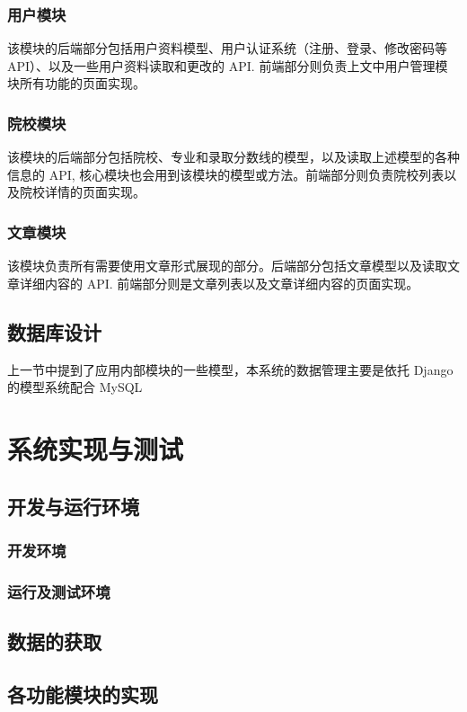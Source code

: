 \documentclass[a4paper,AutoFakeBold,oneside,12pt]{book}
\begin{document}
\subsection{用户模块}
该模块的后端部分包括用户资料模型、用户认证系统（注册、登录、修改密码等 API）、以及一些用户资料读取和更改的 API. 前端部分则负责上文中用户管理模块所有功能的页面实现。

\subsection{院校模块}
该模块的后端部分包括院校、专业和录取分数线的模型，以及读取上述模型的各种信息的 API, 核心模块也会用到该模块的模型或方法。前端部分则负责院校列表以及院校详情的页面实现。

\subsection{文章模块}
该模块负责所有需要使用文章形式展现的部分。后端部分包括文章模型以及读取文章详细内容的 API. 前端部分则是文章列表以及文章详细内容的页面实现。

\section{数据库设计}
上一节中提到了应用内部模块的一些模型，本系统的数据管理主要是依托 Django 的模型系统配合 MySQL

\chapter{系统实现与测试}

\section{开发与运行环境}
\subsection{开发环境}
\subsection{运行及测试环境}

\section{数据的获取}
\section{各功能模块的实现}
\end{document}
